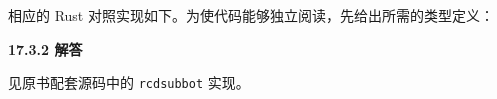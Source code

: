 \begin{taplauthorsolutionentrybox}
相应的 Rust 对照实现如下。为使代码能够独立阅读，先给出所需的类型定义：


\end{taplauthorsolutionentrybox}

\begin{taplauthorsolutionentrybox}
\label{sol:author:17.3.2}
\textbf{17.3.2 解答}

见原书配套源码中的 \texttt{rcdsubbot} 实现。


\end{taplauthorsolutionentrybox}
